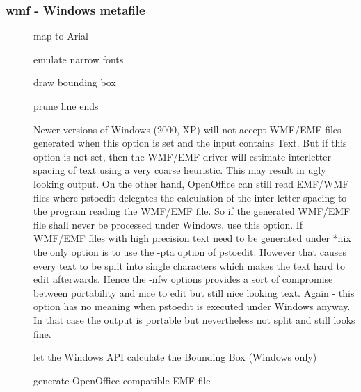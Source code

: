 \documentclass[english,a4paper]{article}
\begin{document}
\subsubsection{wmf - Windows metafile}
\begin{description}
\item[] 
map to Arial


\item[] 
emulate narrow fonts


\item[] 
draw bounding box


\item[] 
prune line ends


\item[] 
Newer versions of Windows (2000, XP) will not accept WMF/EMF files generated when this option is set and the input contains Text. But if this option is not set, then the WMF/EMF driver will estimate interletter spacing of text using a very coarse heuristic. This may result in ugly looking output. On the other hand, OpenOffice can still read EMF/WMF files where pstoedit delegates the calculation of the inter letter spacing to the program reading the WMF/EMF file. So if the generated WMF/EMF file shall never be processed under Windows, use this option. If WMF/EMF files with high precision text need to be generated under *nix the only option is to use the -pta option of pstoedit. However that causes every text to be split into single characters which makes the text hard to edit afterwards. Hence the -nfw options provides a sort of compromise between portability and nice to edit but still nice looking text. Again - this option has no meaning when pstoedit is executed under Windows anyway. In that case the output is portable but nevertheless not split and still looks fine.


\item[] 
let the Windows API calculate the Bounding Box (Windows only)


\item[] 
generate OpenOffice compatible EMF file


\end{description}
\end{document}
